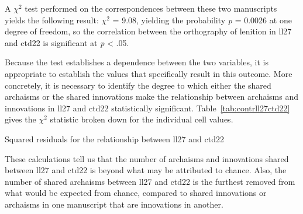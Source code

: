 
A \(\chi^2\) test performed on the correspondences between these two manuscripts yields the following result: \(\chi^2\) = 9.08, yielding the probability \emph{p} = 0.0026 at one degree of freedom, so the correlation between the orthography of lenition in \gls{ll27} and \gls{ctd22} is  significant at \textit{p} < .05.

Because the test establishes a dependence between the two variables, it is appropriate to establish the values that specifically result in  this outcome. More concretely, it is necessary to identify the degree to which either the shared archaisms or the shared innovations  make the relationship between archaisms and innovations in \gls{ll27} and \gls{ctd22} statistically significant. Table~\ref{tab:contrll27ctd22} gives the \(\chi^2\) statistic broken down for the individual cell values.

\begin{table}[h]
  \centering
  \caption{Squared residuals for the relationship between \acrshort{ll27} and \acrshort{ctd22}}
  \label{tab:contrll27ctd22}
  
\end{table}

These calculations tell us that the number of archaisms and innovations shared between \gls{ll27} and \gls{ctd22} is beyond what may be attributed to chance. Also, the number of shared archaisms between \gls{ll27} and \gls{ctd22} is the furthest removed from what would be expected from chance, compared to shared innovations or archaisms in one manuscript that are innovations in another.

